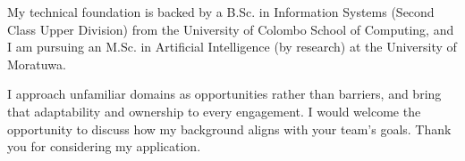 \documentclass[11pt]{article}
\begin{document}
My technical foundation is backed by a B.Sc. in Information Systems (Second Class Upper Division) from the University of Colombo School of Computing, and I am pursuing an M.Sc. in Artificial Intelligence (by research) at the University of Moratuwa.

I approach unfamiliar domains as opportunities rather than barriers, and bring that adaptability and ownership to every engagement. I would welcome the opportunity to discuss how my background aligns with your team's goals. Thank you for considering my application.

\end{document}
